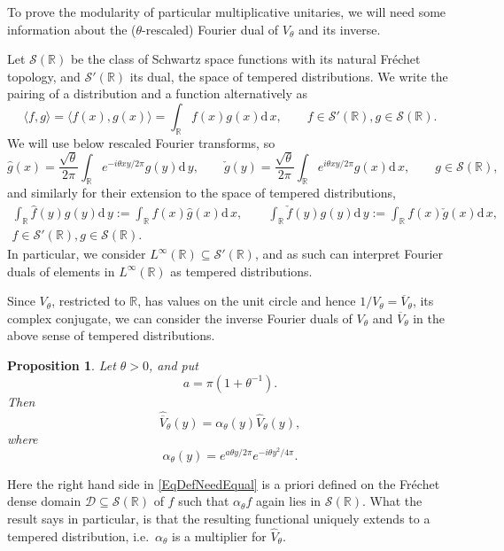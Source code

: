 \documentclass[11pt, reqno]{amsart}
\newtheorem{prop}[theorem]{Proposition}
\theoremstyle{definition}
\numberwithin{equation}{section}
\def\msD{\mathscr D}
\def\R{\mathbb R}
\def\Sc{\mathcal S}
\newcommand{\rd}{\mathrm{d}\!\,}
\begin{document}
To prove the modularity of particular multiplicative unitaries, we will need some information about the ($\theta$-rescaled) Fourier dual of $V_{\theta}$ and its inverse. 

Let $\Sc(\R)$ be the class of Schwartz space functions with its natural Fréchet topology, and $\Sc'(\R)$ its dual, the space of tempered distributions. We write the pairing of a distribution and a function alternatively as 
\[
\langle f,g\rangle = \langle f(x),g(x)\rangle = \int_{\R} f(x)g(x)\rd x,\qquad f\in \Sc'(\R),g\in \Sc(\R).
\]
We will use below rescaled Fourier transforms, so 
\begin{equation}\label{EqFourTrans}
\hat{g}(x) =  \frac{\sqrt{\theta}}{2\pi} \int_{\R} e^{-i\theta xy/2\pi}g(y)\rd y,\qquad \check{g}(y) = \frac{\sqrt{\theta}}{2\pi} \int_{\R} e^{i\theta xy/2\pi}g(x)\rd x,\qquad g\in \Sc(\R),
\end{equation}
and similarly for their extension to the space of tempered distributions, 
\begin{multline*}
\int_{\R} \hat{f}(y)g(y)\rd y :=  \int_{\R} f(x) \hat{g}(x)\rd x,\qquad \int_{\R} \check{f}(y)g(y)\rd y :=  \int_{\R} f(x) \check{g}(x)\rd x,\\ f\in \Sc'(\R),g \in \Sc(\R).
\end{multline*}
In particular, we consider $L^{\infty}(\R) \subseteq \Sc'(\R)$, and as such can interpret Fourier duals of elements in $L^{\infty}(\R)$ as tempered distributions.

Since $V_{\theta}$, restricted to $\R$, has values on the unit circle and hence $1/V_{\theta}= \overline{V}_{\theta}$, its complex conjugate, we can consider the inverse Fourier duals of $V_{\theta}$ and $\overline{V}_{\theta}$ in the above sense of tempered distributions. 

\begin{prop}\label{PropFourDualV}
Let $\theta>0$, and put
\[
a = \pi(1+\theta^{-1}).
\]
Then 
\begin{equation}\label{EqDefNeedEqual}
\hat{\overline{V}}_{\theta}(y) = \alpha_{\theta}(y)\hat{V}_{\theta}(y),
\end{equation}
where 
\begin{equation}\label{EqDefAlphaMult}
\alpha_{\theta}(y) = e^{a\theta y/2\pi} e^{-i\theta y^2/4\pi}.
\end{equation}
\end{prop} 
Here the right hand side in \eqref{EqDefNeedEqual} is a priori defined on the Fréchet dense domain $\msD \subseteq \Sc(\R)$ of $f$ such that $\alpha_{\theta}f$ again lies in $\Sc(\R)$. What the result says in particular, is that the resulting functional uniquely extends to a tempered distribution, i.e.\ $\alpha_{\theta}$ is a multiplier for $\hat{V}_{\theta}$.
\end{document}
